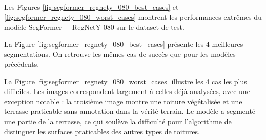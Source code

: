 Les Figures \ref{fig:segformer_regnety_080_best_cases} et \ref{fig:segformer_regnety_080_worst_cases} montrent les performances extrêmes du modèle SegFormer + RegNetY-080 sur le dataset de test.

La Figure \ref{fig:segformer_regnety_080_best_cases} présente les 4 meilleures segmentations. On retrouve les mêmes cas de succès que pour les modèles précédents.

La Figure \ref{fig:segformer_regnety_080_worst_cases} illustre les 4 cas les plus difficiles. Les images correspondent largement à celles déjà analysées, avec une exception notable : la troisième image montre une toiture végétalisée et une terrasse praticable sans annotation dans la vérité terrain. Le modèle a segmenté une partie de la terrasse, ce qui soulève la difficulté pour l'algorithme de distinguer les surfaces praticables des autres types de toitures.

